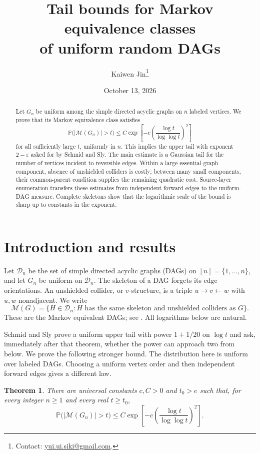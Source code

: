\documentclass[11pt]{article}
\title{Tail bounds for Markov equivalence classes\protect\\of uniform random DAGs}
\author{Kaiwen Jin\thanks{Contact: \href{mailto:yui.ui.siki@gmail.com}{yui.ui.siki@gmail.com}.}}
\date{October 13, 2026}
\newtheorem{theorem}{Theorem}[section]
\theoremstyle{remark}
\newcommand{\Prob}{\mathbb P}
\newcommand{\D}{\mathcal D}
\newcommand{\M}{\mathcal M}
\begin{document}
\maketitle
\begin{abstract}
Let $G_n$ be uniform among the simple directed acyclic graphs on $n$ labeled
vertices. We prove that its Markov equivalence class satisfies
\[
\Prob\bigl(|\M(G_n)|>t\bigr)
 \le C\exp\left[-c\left(\frac{\log t}{\log\log t}\right)^2\right]
\]
for all sufficiently large $t$, uniformly in $n$. This implies the upper tail
with exponent $2-\varepsilon$ asked for by Schmid and Sly. The main estimate is
a Gaussian tail for the number of vertices incident to reversible edges.
Within a large essential-graph component, absence of unshielded colliders is
costly; between many small components, their common-parent condition supplies
the remaining quadratic cost. Source-layer enumeration transfers these
estimates from independent forward edges to the uniform-DAG measure.
Complete skeletons show that the logarithmic scale of the bound is sharp up to
constants in the exponent.
\end{abstract}

\section{Introduction and results}
Let $\D_n$ be the set of simple directed acyclic graphs (DAGs) on
$[n]=\{1,\ldots,n\}$, and let $G_n$ be uniform on $\D_n$. The skeleton of a
DAG forgets its edge orientations. An unshielded collider, or $v$-structure,
is a triple $u\to v\leftarrow w$ with $u,w$ nonadjacent. We write
\[
\M(G)=\{H\in\D_n:H\text{ has the same skeleton and unshielded colliders as }G\}.
\]
These are the Markov equivalent DAGs; see \cite[Theorem 2.1]{AMP}.
All logarithms below are natural.

Schmid and Sly \cite[Theorem 1.1]{SS} prove a uniform upper tail with power
$1+1/20$ on $\log t$ and ask, immediately after that theorem, whether the
power can approach two from below. We prove the following stronger bound.
The distribution here is uniform over labeled DAGs. Choosing a uniform
vertex order and then independent forward edges gives a different law.

\begin{theorem}\label{thm:main}
There are universal constants $c,C>0$ and $t_0>e$ such that, for every integer
$n\ge1$ and every real $t\ge t_0$,
\begin{equation}\label{eq:main}
 \Prob\bigl(|\M(G_n)|>t\bigr)
 \le C\exp\left[-c\left(\frac{\log t}{\log\log t}\right)^2\right].
\end{equation}
\end{theorem}
\end{document}
